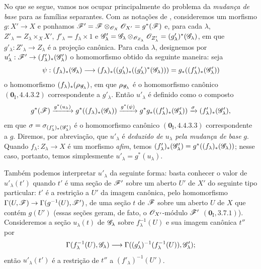 \begin{env}[11.9.5]
\label{IV.11.9.5}
No que se segue, vamos nos
ocupar principalmente do
problema da \emph{mudança
de base} para as famílias
separantes. Com as
notações de
,
consideremos um morfismo
$g:X'\to X$ e ponhamos
$\mathscr{F}'=
\mathscr{F}\otimes_{\mathscr{O}_X}
\mathscr{O}_{X'}=g^*(\mathscr{F})$
e, para cada $\lambda$,
$Z'_\lambda=
Z_\lambda\times_X X'$,
$f'_\lambda=f_\lambda
\times 1$ e
$\mathscr{G}'_\lambda=
\mathscr{G}_\lambda
\otimes_{\mathscr{O}_{Z_\lambda}}
\mathscr{O}_{Z'_\lambda}
=(g'_\lambda)^*
(\mathscr{G}_\lambda)$,
em que
$g'_\lambda:
Z'_\lambda\to Z_\lambda$
é a projeção canônica.
Para cada $\lambda$,
designemos por
$u'_\lambda:
\sh{F}'\to
(f'_\lambda)_*
(\sh{G}'_\lambda)$
o homomorfismo obtido
da seguinte maneira:
seja
\[
\psi:
(f_\lambda)_*
(\mathscr{G}_\lambda)
\longrightarrow
(f_\lambda)_*
((g'_\lambda)_*
((g'_\lambda)^*
(\mathscr{G}_\lambda)))
=g_*((f'_\lambda)_*
(\mathscr{G}'_\lambda))
\]
o homomorfismo
$(f_\lambda)_*
(\rho_{\mathscr{G}_\lambda})$,
em que
$\rho_{\mathscr{G}_\lambda}$
é o homomorfismo
canônico
$(\mathbf 0_{\mathrm I},
4.4.3.2)$ correspondente
a $g'_\lambda$.
Então $u'_\lambda$
é definido como o
composto
\[
g^*(\mathscr{F})
\xrightarrow{g^*(u_\lambda)}
g^*((f_\lambda)_*
(\mathscr{G}_\lambda))
\xrightarrow{g^*(\psi)}
g^*g_*((f'_\lambda)_*
(\mathscr{G}'_\lambda))
\xrightarrow{\sigma}
(f'_\lambda)_*
(\mathscr{G}'_\lambda),
\]
em que
$\sigma=
\sigma_{(f'_\lambda)_*
(\mathscr{G}'_\lambda)}$
é o homomorfismo
canônico
$(\mathbf 0_{\mathrm I},
4.4.3.3)$ correspondente
a $g$. Diremos, por
abreviação, que
$u'_\lambda$ é
\emph{deduzido de
$u_\lambda$ pela mudança
de base} $g$. Quando
$f_\lambda:
Z_\lambda\to X$ é
um morfismo \emph{afim},
temos
$(f'_\lambda)_*
(\mathscr{G}'_\lambda)
=g^*((f_\lambda)_*
(\mathscr{G}_\lambda))$;
nesse caso, portanto,
temos simplesmente
$u'_\lambda=g^*(u_\lambda)$.

Também podemos interpretar
$u'_\lambda$ da seguinte
forma: basta conhecer o
valor de $u'_\lambda(t')$
quando $t'$ é uma seção
de $\mathscr{F}'$ sobre um
aberto $U'$ de $X'$ do
seguinte tipo particular:
$t'$ é a restrição a
$U'$ da imagem canônica,
pelo homomorfismo
$\Gamma(U,\sh{F})\to
\Gamma(g^{-1}(U),
\sh{F}')$, de uma seção
$t$ de $\mathscr{F}$ sobre
um aberto $U$ de $X$
que contém $g(U')$
(essas seções geram,
de fato, o
$\mathscr{O}_{X'}$-módulo
$\mathscr{F}'$
$(\mathbf 0_{\mathrm I},
3.7.1)$). Consideremos
a seção $u_\lambda(t)$
de $\mathscr{G}_\lambda$
sobre $f_\lambda^{-1}(U)$
e sua imagem canônica
$t''$ por
\[
\Gamma(f_\lambda^{-1}(U),
\mathscr{G}_\lambda)
\longrightarrow
\Gamma((g'_\lambda)^{-1}
(f_\lambda^{-1}(U)),
\mathscr{G}'_\lambda);
\]
então $u'_\lambda(t')$
é a restrição de $t''$
a $(f'_\lambda)^{-1}(U')$.


\end{env}
